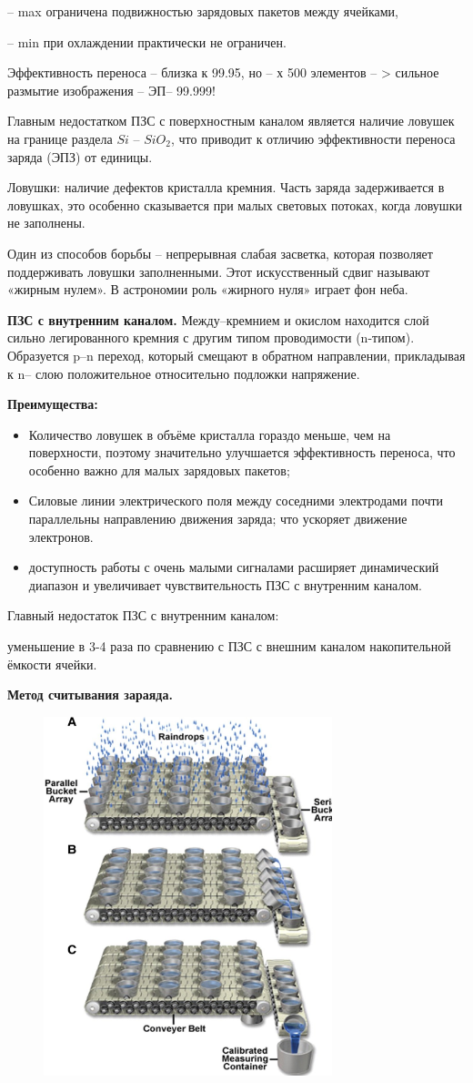 \documentclass[12pt]{article}
\begin{document}
-- max ограничена подвижностью зарядовых пакетов между
ячейками,

-- min при охлаждении практически не ограничен.

Эффективность переноса – близка к 99.95, но
-- х 500 элементов – > сильное размытие изображения
-- ЭП-- 99.999!


Главным недостатком ПЗС с поверхностным каналом является наличие ловушек на
границе раздела $Si$ – $SiO_2$, что приводит к отличию эффективности переноса заряда
(ЭПЗ) от единицы.

Ловушки: наличие дефектов кристалла кремния. Часть заряда задерживается в
ловушках, это особенно сказывается при малых световых потоках, когда ловушки не
заполнены.

Один из способов борьбы – непрерывная слабая засветка, которая позволяет
поддерживать ловушки заполненными. Этот искусственный сдвиг называют
«жирным нулем». В астрономии роль «жирного нуля» играет фон неба.


\textbf{ПЗС с внутренним каналом.}
Между–кремнием и окислом
находится слой сильно
легированного кремния с другим
типом проводимости (n-типом).
Образуется p–n переход,
который смещают в обратном
направлении, прикладывая к n–
слою положительное
относительно подложки
напряжение.

\textbf{Преимущества:}
\begin{itemize}
	\item Количество ловушек в объёме кристалла гораздо меньше, чем на
	поверхности, поэтому значительно улучшается эффективность
	переноса, что особенно важно для малых зарядовых пакетов;
	\item Силовые линии электрического поля между соседними
	электродами почти параллельны направлению движения заряда;
	что ускоряет движение электронов.
	\item доступность работы с очень малыми сигналами расширяет
	динамический диапазон и увеличивает чувствительность ПЗС с
	внутренним каналом.
\end{itemize}

Главный недостаток ПЗС с внутренним каналом: 

уменьшение в 3-4 раза по сравнению с ПЗС с внешним каналом
накопительной ёмкости ячейки.

\textbf{Метод считывания зараяда.}
\begin{figure}[h]
	\centering
	\includegraphics[width=0.3\linewidth]{"Снимок экрана от 2024-12-23 20-00-48"}
\end{figure}
\end{document}
